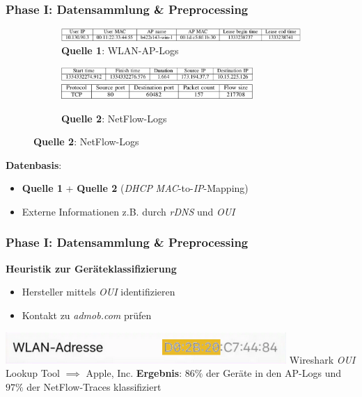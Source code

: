 \documentclass{beamer}
\begin{document}
\begin{frame}
  \frametitle{Phase I: Datensammlung \& Preprocessing}

  \begin{figure}[H]
    \centering
    \begin{subfigure}[b]{\textwidth}
      \centering
      \includegraphics[width=\textwidth]{images/AP_entry.png}
      \caption*{\textbf{Quelle 1}: WLAN-AP-Logs \cite{Alipour2018}}
    \end{subfigure}

    \begin{subfigure}[b]{\textwidth}
      \centering
      \includegraphics[width=0.8\textwidth]{images/netflow_entry_p1.png}
      \includegraphics[width=0.8\textwidth]{images/netflow_entry_p2.png}
      \caption*{\textbf{Quelle 2}: NetFlow-Logs \cite{Alipour2018}}
    \end{subfigure}
  \end{figure}
  
  \textbf{Datenbasis}:
  
  \begin{itemize}
    \item \textbf{Quelle 1} + \textbf{Quelle 2} (\textit{DHCP} \textit{MAC}-to-\textit{IP}-Mapping)
    \item Externe Informationen z.B. durch \textit{rDNS} und \textit{OUI}
    
  \end{itemize}
      
\end{frame}

\begin{frame}
  \frametitle{Phase I: Datensammlung \& Preprocessing}
  \textbf{Heuristik zur Geräteklassifizierung}
  \begin{itemize}
    \item Hersteller mittels \textit{OUI} identifizieren
    \item Kontakt zu \textit{admob.com} prüfen
  \end{itemize}
  \includegraphics[width=0.8\textwidth]{images/MAC_iPhone.png}\newline
  Wireshark \textit{OUI} Lookup Tool $\implies$ Apple, Inc.\newline\newline
  \textbf{Ergebnis}: $86\%$ der Geräte in den AP-Logs und $97\%$ der NetFlow-Traces klassifiziert
\end{frame}
\end{document}
